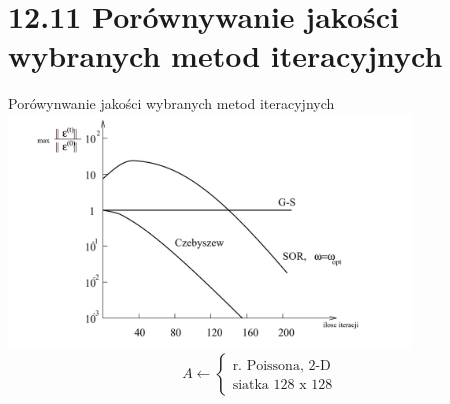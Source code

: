 \section{12.11 Porównywanie jakości wybranych metod iteracyjnych}

\begin{frame}{Porówynwanie jakości wybranych metod iteracyjnych}
  \includegraphics[height=0.5\textheight, width=0.8\textwidth]{img/12/iteracja4}
  $$
  A\leftarrow
  \begin{cases}
    \text{r. Poissona, 2-D}\\
    \text{siatka 128 x 128}
  \end{cases}
  $$
\end{frame}
